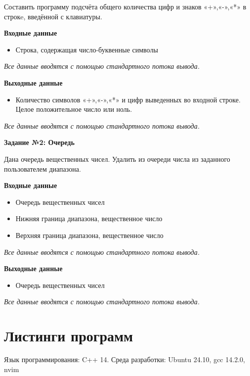 \documentclass[a4paper,12pt]{article}
\begin{document}
	Составить программу подсчёта общего количества цифр и знаков «+»,«-»,«*» 
	в строкe, введённой с клавиатуры.
	
	\textbf{Входные данные}
	
	\begin{itemize}
		\item Строка, содержащая число-буквенные символы
	\end{itemize}
	
	\textit{Все данные вводятся с помощью стандартного потока вывода.}		

	\textbf{Выходные данные}

	\begin{itemize}
		\item Количество символов «+»,«-»,«*» и цифр выведенных во входной строке. Целое положительное число или ноль.
	\end{itemize}

	\textit{Все данные вводятся с помощью стандартного потока вывода.}		

		
	\textbf{Задание №2: Очередь}
	
	Дана очередь вещественных чисел. Удалить из очереди числа из заданного 
	пользователем диапазона.

	\textbf{Входные данные}

	\begin{itemize}
		\item Очередь вещественных чисел
		\item Нижняя граница диапазона, вещественное число
		\item Верхняя граница диапазона, вещественное число 
	\end{itemize}

	\textit{Все данные вводятся с помощью стандартного потока вывода.}		

	\textbf{Выходные данные}

	\begin{itemize}
		\item Очередь вещественных чисел
	\end{itemize}

	\textit{Все данные вводятся с помощью стандартного потока вывода.}		
	
	\newpage	
	\section{Листинги программ}
	Язык программирования: C++ 14. Среда разработки: Ubuntu 24.10, gcc 14.2.0, nvim
	
	
\end{document}
